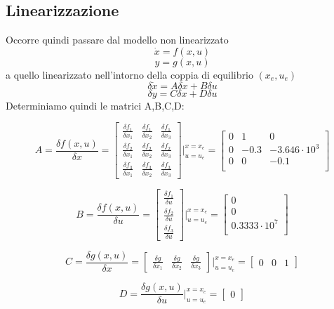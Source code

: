 \documentclass{article}
\begin{document}
\subsection{Linearizzazione}
Occorre quindi passare dal modello non linearizzato
\[
\Dot{x}=f(x,u)
\]
\[
y=g(x,u)
\]
a quello linearizzato nell'intorno della coppia di equilibrio $(x_e,u_e)$
\[
\delta\Dot{x}=A\delta{x}+B\delta{u}
\]
\[
\delta{y}=C\delta{x}+D\delta{u}
\]
Determiniamo quindi le matrici A,B,C,D:
\begin{large}
\[
A=\frac{ \delta{f(x,u)}}{\delta{x}}=
\begin{bmatrix}\frac{\delta{f_1}}{\delta{x_1}} & \frac{\delta{f_1}}{\delta{x_2}}    
& \frac{\delta{f_1}}{\delta{x_3}}\\ 
\frac{\delta{f_2}}{\delta{x_1}} & \frac{\delta{f_2}}{\delta{x_2}}& \frac{\delta{f_2}}{\delta{x_3}} \\
\frac{\delta{f_3}}{\delta{x_1}} & \frac{\delta{f_3}}{\delta{x_2}}& \frac{\delta{f_3}}{\delta{x_3}}
\end{bmatrix}|_{u=u_e}^{x=x_e} = 
\begin{bmatrix}0&1&0\\0&-0.3&-3.646\cdot{10}^3\\0&0&-0.1\\\end{bmatrix}
\]

\[
B=\frac{ \delta{f(x,u)}}{\delta{u}}=
\begin{bmatrix}\frac{\delta{f_1}}{\delta{u}}\\ \frac{\delta{f_2}}{\delta{u}}\\ \frac{\delta{f_3}}{\delta{u}}\end{bmatrix}|_{u=u_e}^{x=x_e}=
\begin{bmatrix}0\\0\\0.3333\cdot10^7\\\end{bmatrix}
\]

\[
C=\frac{ \delta{g(x,u)}}{\delta{x}}=
\begin{bmatrix}\frac{\delta{g}}{\delta{x_1}} & \frac{\delta{g}}{\delta{x_2}}& \frac{\delta{g}}{\delta{x_3}}\end{bmatrix}|_{u=u_e}^{x=x_e}=
\begin{bmatrix}0 & 0 & 1\end{bmatrix}
\]

\[
D=\frac{ \delta{g(x,u)}}{\delta{u}}|_{u=u_e}^{x=x_e}=
\begin{bmatrix}0\end{bmatrix}
\]
\end{large}
\end{document}
